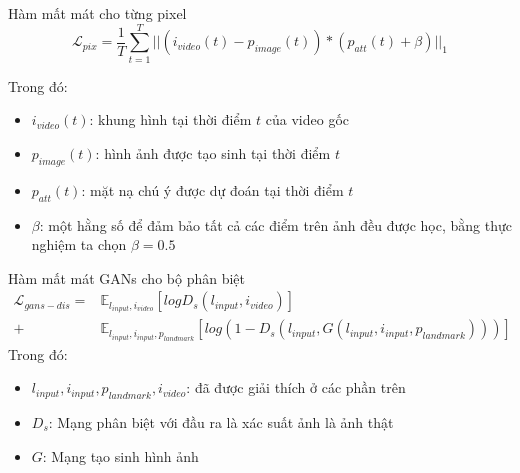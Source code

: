 \begin{frame}{Hàm mất mát cho từng pixel}
    \begin{equation}
        \mathcal{L}_{pix} = \frac{1}{T}\sum^T_{t=1}||(i_{video}(t)-p_{image}(t))*(p_{att}(t)+\beta)||_1
    \end{equation}
    
    Trong đó:
    \begin{itemize}
        \item \textbf{$i_{video}(t)$}: khung hình tại thời điểm $t$ của video gốc
        \item \textbf{$p_{image}(t)$}: hình ảnh được tạo sinh tại thời điểm $t$
        \item \textbf{$p_{att}(t)$}: mặt nạ chú ý được dự đoán tại thời điểm $t$
        \item \textbf{$\beta$}: một hằng số để đảm bảo tất cả các điểm trên ảnh đều được học, bằng thực nghiệm ta chọn $\beta = 0.5$ 
    \end{itemize}
    
\end{frame}

\begin{frame}{Hàm mất mát GANs cho bộ phân biệt}
    \begin{equation}
        \begin{split}
        \mathcal{L}_{gans-dis} = &\mathbb{E}_{l_{input},i_{video}}[logD_s(l_{input},i_{video})]\\
        +&\mathbb{E}_{l_{input},i_{input},p_{landmark}}[log(1-D_s(l_{input},G(l_{input},i_{input},p_{landmark})))]
        \end{split}
    \end{equation}
    Trong đó:
    \begin{itemize}
        \item \textbf{$l_{input},i_{input},p_{landmark},i_{video}$}: đã được giải thích ở các phần trên
        \item \textbf{$D_s$}: Mạng phân biệt với đầu ra là xác suất ảnh là ảnh thật
        \item \textbf{$G$}: Mạng tạo sinh hình ảnh
    \end{itemize}
\end{frame}


